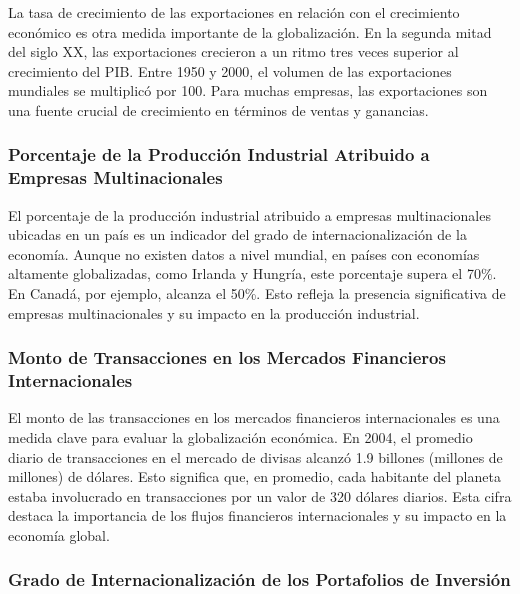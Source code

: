 \documentclass[
  a4paper,
]{article}
\begin{document}
La tasa de crecimiento de las exportaciones en relación con el
crecimiento económico es otra medida importante de la globalización. En
la segunda mitad del siglo XX, las exportaciones crecieron a un ritmo
tres veces superior al crecimiento del PIB. Entre 1950 y 2000, el
volumen de las exportaciones mundiales se multiplicó por 100. Para
muchas empresas, las exportaciones son una fuente crucial de crecimiento
en términos de ventas y ganancias.

\hypertarget{porcentaje-de-la-producciuxf3n-industrial-atribuido-a-empresas-multinacionales}{%
\subsubsection{Porcentaje de la Producción Industrial Atribuido a
Empresas
Multinacionales}\label{porcentaje-de-la-producciuxf3n-industrial-atribuido-a-empresas-multinacionales}}

El porcentaje de la producción industrial atribuido a empresas
multinacionales ubicadas en un país es un indicador del grado de
internacionalización de la economía. Aunque no existen datos a nivel
mundial, en países con economías altamente globalizadas, como Irlanda y
Hungría, este porcentaje supera el 70\%. En Canadá, por ejemplo, alcanza
el 50\%. Esto refleja la presencia significativa de empresas
multinacionales y su impacto en la producción industrial.

\hypertarget{monto-de-transacciones-en-los-mercados-financieros-internacionales}{%
\subsubsection{Monto de Transacciones en los Mercados Financieros
Internacionales}\label{monto-de-transacciones-en-los-mercados-financieros-internacionales}}

El monto de las transacciones en los mercados financieros
internacionales es una medida clave para evaluar la globalización
económica. En 2004, el promedio diario de transacciones en el mercado de
divisas alcanzó 1.9 billones (millones de millones) de dólares. Esto
significa que, en promedio, cada habitante del planeta estaba
involucrado en transacciones por un valor de 320 dólares diarios. Esta
cifra destaca la importancia de los flujos financieros internacionales y
su impacto en la economía global.

\hypertarget{grado-de-internacionalizaciuxf3n-de-los-portafolios-de-inversiuxf3n}{%
\subsubsection{Grado de Internacionalización de los Portafolios de
Inversión}\label{grado-de-internacionalizaciuxf3n-de-los-portafolios-de-inversiuxf3n}}
\end{document}
